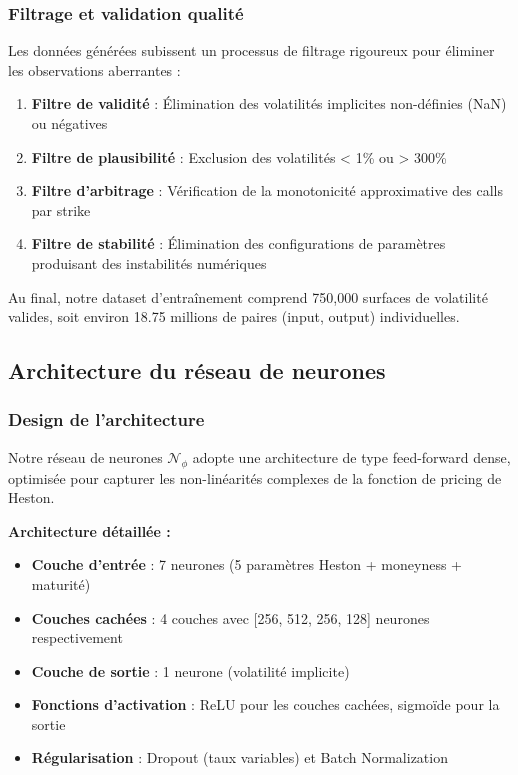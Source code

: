 \subsubsection{Filtrage et validation qualité}

Les données générées subissent un processus de filtrage rigoureux pour éliminer les observations aberrantes :

\begin{enumerate}
\item \textbf{Filtre de validité} : Élimination des volatilités implicites non-définies (NaN) ou négatives
\item \textbf{Filtre de plausibilité} : Exclusion des volatilités < 1\% ou > 300\%
\item \textbf{Filtre d'arbitrage} : Vérification de la monotonicité approximative des calls par strike
\item \textbf{Filtre de stabilité} : Élimination des configurations de paramètres produisant des instabilités numériques
\end{enumerate}

Au final, notre dataset d'entraînement comprend 750,000 surfaces de volatilité valides, soit environ 18.75 millions de paires (input, output) individuelles.

\subsection{Architecture du réseau de neurones}

\subsubsection{Design de l'architecture}

Notre réseau de neurones $\mathcal{N}_\phi$ adopte une architecture de type feed-forward dense, optimisée pour capturer les non-linéarités complexes de la fonction de pricing de Heston.

\textbf{Architecture détaillée :}
\begin{itemize}
\item \textbf{Couche d'entrée} : 7 neurones (5 paramètres Heston + moneyness + maturité)
\item \textbf{Couches cachées} : 4 couches avec [256, 512, 256, 128] neurones respectivement
\item \textbf{Couche de sortie} : 1 neurone (volatilité implicite)
\item \textbf{Fonctions d'activation} : ReLU pour les couches cachées, sigmoïde pour la sortie
\item \textbf{Régularisation} : Dropout (taux variables) et Batch Normalization
\end{itemize}

